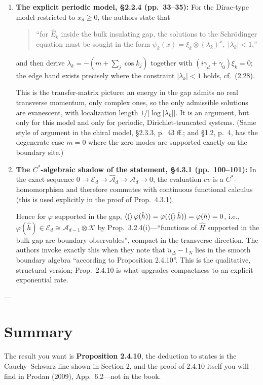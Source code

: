 \begin{enumerate}
    \item \textbf{The explicit periodic model, \S2.2.4 (pp.~33--35):} 
    For the Dirac-type model restricted to $x_d \ge 0$, the authors state that 
    \begin{quote}
        ``for $\hat{E}_k$ inside the bulk insulating gap, the solutions to the Schrödinger equation must be sought in the form $\psi_k(x) = \xi_k \otimes (\lambda_k)^x, \; |\lambda_k| < 1$,''
    \end{quote}
    and then derive $\lambda_k = -(m + \sum_j \cos k_j)$ together with $(i\gamma_d + \gamma_0)\xi_k = 0$; the edge band exists precisely where the constraint $|\lambda_k| < 1$ holds, cf.~(2.28). 

    This is the transfer-matrix picture: an energy in the gap admits no real transverse momentum, only complex ones, so the only admissible solutions are evanescent, with localization length $1/|\log|\lambda_k||$. It is an argument, but only for this model and only for periodic, Dirichlet-truncated systems. (Same style of argument in the chiral model, \S2.3.3, p.~43 ff.; and \S1.2, p.~4, has the degenerate case $m = 0$ where the zero modes are supported exactly on the boundary site.)

    \item \textbf{The $C^*$-algebraic shadow of the statement, \S4.3.1 (pp.~100--101):} 
    In the exact sequence $0 \to \mathcal{E}_d \to \hat{\mathcal{A}}_d \to \mathcal{A}_d \to 0$, the evaluation $ev$ is a $C^*$-homomorphism and therefore commutes with continuous functional calculus (this is used explicitly in the proof of Prop.~4.3.1). 
    
    Hence for $\varphi$ supported in the gap, $\ev(\varphi(\hat{h})) = \varphi(\ev(\hat{h})) = \varphi(h) = 0$, i.e., $\varphi(\hat{h}) \in \mathcal{E}_d \cong \mathcal{A}_{d-1} \otimes \mathcal{K}$ by Prop.~3.2.4(i)---``functions of $\hat{H}$ supported in the bulk gap are boundary observables'', compact in the transverse direction. The authors invoke exactly this when they note that $\tilde{u}_\Delta - 1_N$ lies in the smooth boundary algebra ``according to Proposition 2.4.10''. This is the qualitative, structural version; Prop.~2.4.10 is what upgrades compactness to an explicit exponential rate.
\end{enumerate}

---

\section*{Summary}

The result you want is \textbf{Proposition 2.4.10}, the deduction to states is the Cauchy--Schwarz line shown in Section 2, and the proof of 2.4.10 itself you will find in Prodan (2009), App.~6.2---not in the book.